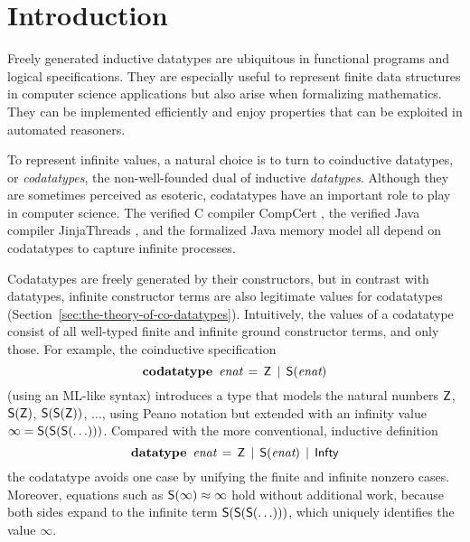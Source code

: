 \setcounter{footnote}{0}

\section{Introduction}
\label{sec:introduction}

Freely generated inductive datatypes are ubiquitous in functional programs and
logical specifications. They are especially
useful to represent finite data structures in computer science applications but
also arise when formalizing mathematics.
They can be implemented efficiently and enjoy
properties that can be exploited in automated reasoners. 
%

To represent infinite values, %
a natural choice is to turn to coinductive datatypes, or \emph{codatatypes},
the non-well-founded dual of inductive \emph{datatypes}.
%
Although they are sometimes perceived as esoteric, codatatypes have an important
role to play in computer science. The verified C compiler CompCert
\cite{leroy-2009}, the verified Java compiler Jinja\-Threads
\cite{lochbihler-2010-jinja}, and the formalized Java memory model
\cite{lochbihler-2014-jmm} all depend on codatatypes to capture infinite
processes.

Codatatypes are freely generated by their constructors, but in contrast with datatypes,
infinit\-e constructor terms are also legitimate values for codatatypes
(Section~\ref{sec:the-theory-of-co-datatypes}). Intuitively, the
values of a codatatype consist of all well-typed finite and infinite ground constructor
terms, and only those. For example, the coinductive specification
%
\[\textbf{codatatype}~\,\textit{enat} \,=\, \textsf{Z} \,\mid\, \textsf{S}(\textit{enat})\]
%
(using an ML-like syntax) introduces a type that
models the natural numbers $\textsf{Z}$, $\textsf{S}(\textsf{Z})$, $\textsf{S}(\textsf{S}(\textsf{Z}))$, $\ldots$\afterLdots{},
using Peano notation but extended with an
infinity value $\infty = \textsf{S}(\textsf{S}(\textsf{S}(\ldots)))$. Compared
with the more conventional, inductive definition
\[\textbf{datatype}~\,\textit{enat} \,=\, \textsf{Z} \,\mid\, \textsf{S}(\textit{enat}) \,\mid\, \textsf{Infty}\]
%
the codatatype avoids one case by unifying the finite and infinite nonzero cases.
Moreover, equations such as $\textsf{S}(\infty) \approx \infty$ hold without additional
work, because both sides expand to the infinite term
$\textsf{S}(\textsf{S}(\textsf{S}(\ldots)))$, which uniquely identifies the
value $\infty$.

